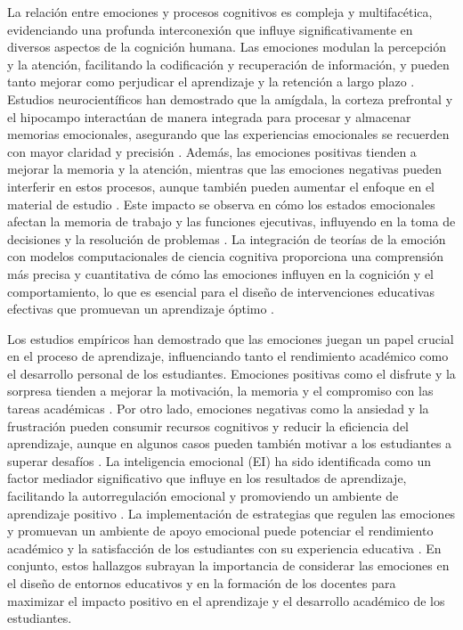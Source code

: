 La relación entre emociones y procesos cognitivos es compleja y multifacética, evidenciando una profunda interconexión que influye significativamente en diversos aspectos de la cognición humana. Las emociones modulan la percepción y la atención, facilitando la codificación y recuperación de información, y pueden tanto mejorar como perjudicar el aprendizaje y la retención a largo plazo \cite{tyng_influences_2017}. Estudios neurocientíficos han demostrado que la amígdala, la corteza prefrontal y el hipocampo interactúan de manera integrada para procesar y almacenar memorias emocionales, asegurando que las experiencias emocionales se recuerden con mayor claridad y precisión \cite{pessoa_impact_2013}. Además, las emociones positivas tienden a mejorar la memoria y la atención, mientras que las emociones negativas pueden interferir en estos procesos, aunque también pueden aumentar el enfoque en el material de estudio \cite{imbir_heart_2016}. Este impacto se observa en cómo los estados emocionales afectan la memoria de trabajo y las funciones ejecutivas, influyendo en la toma de decisiones y la resolución de problemas \cite{inzlicht_emotional_2015}. La integración de teorías de la emoción con modelos computacionales de ciencia cognitiva proporciona una comprensión más precisa y cuantitativa de cómo las emociones influyen en la cognición y el comportamiento, lo que es esencial para el diseño de intervenciones educativas efectivas que promuevan un aprendizaje óptimo \cite{perlovsky_higher_2020}.

Los estudios empíricos han demostrado que las emociones juegan un papel crucial en el proceso de aprendizaje, influenciando tanto el rendimiento académico como el desarrollo personal de los estudiantes. Emociones positivas como el disfrute y la sorpresa tienden a mejorar la motivación, la memoria y el compromiso con las tareas académicas \cite{yin_effects_2023,linnenbrink_role_2007}. Por otro lado, emociones negativas como la ansiedad y la frustración pueden consumir recursos cognitivos y reducir la eficiencia del aprendizaje, aunque en algunos casos pueden también motivar a los estudiantes a superar desafíos \cite{rowe_understanding_2018, ge_emotion_2021}. La inteligencia emocional (EI) ha sido identificada como un factor mediador significativo que influye en los resultados de aprendizaje, facilitando la autorregulación emocional y promoviendo un ambiente de aprendizaje positivo \cite{shafait_assessment_2021}. La implementación de estrategias que regulen las emociones y promuevan un ambiente de apoyo emocional puede potenciar el rendimiento académico y la satisfacción de los estudiantes con su experiencia educativa \cite{tan_influence_2021,mazars_influence_2023}. En conjunto, estos hallazgos subrayan la importancia de considerar las emociones en el diseño de entornos educativos y en la formación de los docentes para maximizar el impacto positivo en el aprendizaje y el desarrollo académico de los estudiantes.

